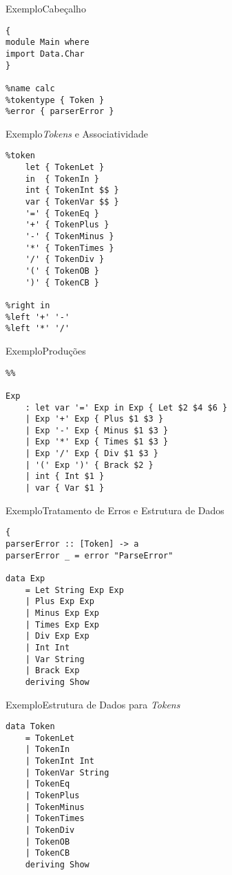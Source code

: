 \documentclass[hyperref={pdfpagelabels=false}]{beamer}
\begin{document}
\begin{frame}[fragile]{Exemplo}{Cabeçalho}
\begin{verbatim}
{
module Main where
import Data.Char
}

%name calc
%tokentype { Token }
%error { parserError }
\end{verbatim}
\end{frame}

\begin{frame}[fragile]{Exemplo}{\textit{Tokens} e Associatividade}
\begin{verbatim}
%token
    let { TokenLet }
    in  { TokenIn }
    int { TokenInt $$ }
    var { TokenVar $$ }
    '=' { TokenEq }
    '+' { TokenPlus }
    '-' { TokenMinus }
    '*' { TokenTimes }
    '/' { TokenDiv }
    '(' { TokenOB }
    ')' { TokenCB }

%right in
%left '+' '-'
%left '*' '/'
\end{verbatim}
\end{frame}

\begin{frame}[fragile]{Exemplo}{Produções}
\begin{verbatim}
%%

Exp
    : let var '=' Exp in Exp { Let $2 $4 $6 }
    | Exp '+' Exp { Plus $1 $3 }
    | Exp '-' Exp { Minus $1 $3 }
    | Exp '*' Exp { Times $1 $3 }
    | Exp '/' Exp { Div $1 $3 }
    | '(' Exp ')' { Brack $2 }
    | int { Int $1 }
    | var { Var $1 } 
\end{verbatim}
\end{frame}

\begin{frame}[fragile]{Exemplo}{Tratamento de Erros e Estrutura de Dados}
\begin{verbatim}
{
parserError :: [Token] -> a
parserError _ = error "ParseError"

data Exp
    = Let String Exp Exp
    | Plus Exp Exp
    | Minus Exp Exp
    | Times Exp Exp
    | Div Exp Exp
    | Int Int
    | Var String
    | Brack Exp
    deriving Show
\end{verbatim}
\end{frame}

\begin{frame}[fragile]{Exemplo}{Estrutura de Dados para \textit{Tokens}}
\begin{verbatim}
data Token
    = TokenLet
    | TokenIn
    | TokenInt Int
    | TokenVar String
    | TokenEq
    | TokenPlus
    | TokenMinus
    | TokenTimes
    | TokenDiv
    | TokenOB
    | TokenCB
    deriving Show
\end{verbatim}
\end{frame}
\end{document}
